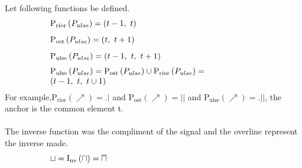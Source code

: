 \documentclass[10pt,journal]{IEEEtran}
\begin{document}
Let following functions be defined.
\begin{equation}
 \begin{minipage}{250pt}
\begin{flushleft} $\displaystyle \operatorname{P_{rior}}{\left(P_{ulse} \right)} = \left( t - 1, \  t\right)$  \end{flushleft}
 \end{minipage}
 \end{equation}
\begin{equation}
 \begin{minipage}{250pt}
\begin{flushleft} $\displaystyle \operatorname{P_{ost}}{\left(P_{ulse} \right)} = \left( t, \  t + 1\right)$  \end{flushleft}
 \end{minipage}
 \end{equation}
\begin{equation}
 \begin{minipage}{250pt}
\begin{flushleft} $\displaystyle \operatorname{P_{ulse}}{\left(P_{ulse} \right)} = \left( t - 1, \  t, \  t + 1\right)$  \end{flushleft}
 \end{minipage}
 \end{equation}
\begin{equation}
 \begin{minipage}{250pt}
\begin{flushleft} $\displaystyle \operatorname{P_{ulse}}{\left(P_{ulse} \right)} = \operatorname{P_{ost}}{\left(P_{ulse} \right)}  \cup  \operatorname{P_{rior}}{\left(P_{ulse} \right)} = \left( t - 1, \  t, \  t  \cup  1\right)$  \end{flushleft}
 \end{minipage}
 \end{equation}
For example,$\operatorname{P_{rior}}{\left(\nearrow \right)} = .|$ and $\operatorname{P_{ost}}{\left(\nearrow \right)} = ||$ and $\operatorname{P_{ulse}}{\left(\nearrow \right)} = .||$, the anchor is the common element t. \\ \ \\     The inverse function was the compliment of the signal and the overline     represent the inverse made.
\begin{equation}
 \begin{minipage}{250pt}
\begin{flushleft} $\displaystyle \sqcup = \operatorname{I_{nv}}{\left(\sqcap \right)} = \overline\sqcap$  \end{flushleft}
 \end{minipage}
 \end{equation}
\end{document}
